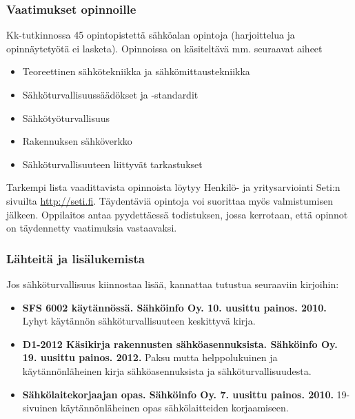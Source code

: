 \begin{frame}
\frametitle{Vaatimukset opinnoille}
Kk-tutkinnossa 45 opintopistettä sähköalan opintoja (harjoittelua ja opinnäytetyötä ei lasketa). Opinnoissa on käsiteltävä mm. seuraavat aiheet
\begin{itemize}
\item Teoreettinen sähkötekniikka ja sähkömittaustekniikka
\item Sähköturvallisuussäädökset ja -standardit
\item Sähkötyöturvallisuus
\item Rakennuksen sähköverkko
\item Sähköturvallisuuteen liittyvät tarkastukset
\end{itemize}
Tarkempi lista vaadittavista opinnoista löytyy Henkilö- ja yritysarviointi Seti:n sivuilta \url{http://seti.fi}. Täydentäviä opintoja voi suorittaa myös valmistumisen jälkeen. Oppilaitos antaa pyydettäessä todistuksen, jossa kerrotaan, että opinnot on täydennetty vaatimuksia vastaavaksi.
\end{frame}



\begin{frame}
\frametitle{Lähteitä ja lisälukemista}
Jos sähköturvallisuus kiinnostaa lisää, kannattaa tutustua seuraaviin kirjoihin:

\begin{itemize}
\item {\bf SFS 6002 käytännössä. Sähköinfo Oy. 10. uusittu painos. 2010.} Lyhyt käytännön sähköturvallisuuteen keskittyvä kirja.
\item {\bf D1-2012 Käsikirja rakennusten sähköasennuksista. Sähköinfo Oy. 19. uusittu painos. 2012.} Paksu mutta helppolukuinen ja käytännönläheinen kirja sähköasennuksista ja sähköturvallisuudesta.
\item {\bf Sähkölaitekorjaajan opas. Sähköinfo Oy. 7. uusittu painos. 2010.} 19-sivuinen käytännönläheinen opas sähkölaitteiden korjaamiseen.
\end{itemize}
\end{frame}
